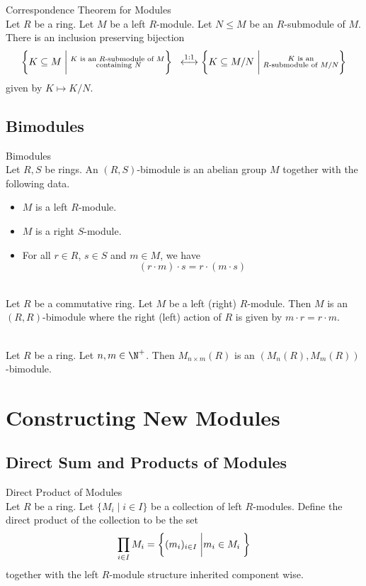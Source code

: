 \documentclass[a4paper]{article}
\begin{document}
\begin{thm}{Correspondence Theorem for Modules}{}\\
Let $R$ be a ring. Let $M$ be a left $R$-module. Let $N\leq M$ be an $R$-submodule of $M$. There is an inclusion preserving bijection $$\left\{K\subseteq M\;\bigg{|}\;\substack{K\text{ is an }R\text{-submodule of }M\\\text{ containing }N}\right\}\;\;\overset{1:1}{\longleftrightarrow}\left\{K\subseteq M/N\;\bigg{|}\;\substack{K\text{ is an}\\R\text{-submodule of }M/N}\right\}$$ given by $K\mapsto K/N$. 
\end{thm}

\subsection{Bimodules}
\begin{defn}{Bimodules}{}\\
Let $R,S$ be rings. An $(R,S)$-bimodule is an abelian group $M$ together with the following data. 
\begin{itemize}
\item $M$ is a left $R$-module. 
\item $M$ is a right $S$-module. 
\item For all $r\in R$, $s\in S$ and $m\in M$, we have $$(r\cdot m)\cdot s=r\cdot(m\cdot s)$$
\end{itemize}
\end{defn}

\begin{eg}{}{}\\
Let $R$ be a commutative ring. Let $M$ be a left (right) $R$-module. Then $M$ is an $(R,R)$-bimodule where the right (left) action of $R$ is given by $m\cdot r=r\cdot m$. 
\end{eg}

\begin{eg}{}{}\\
Let $R$ be a ring. Let $n,m\in\N^+$. Then $M_{n\times m}(R)$ is an $(M_n(R),M_m(R))$-bimodule. 
\end{eg}

\pagebreak
\section{Constructing New Modules}
\subsection{Direct Sum and Products of Modules}
\begin{defn}{Direct Product of Modules}{}\\
Let $R$ be a ring. Let $\{M_i\;|\;i\in I\}$ be a collection of left $R$-modules. Define the direct product of the collection to be the set $$\prod_{i\in I}M_i=\left\{(m_i)_{i\in I}\;\bigg{|}m_i\in M_i\;\right\}$$ together with the left $R$-module structure inherited component wise. 
\end{defn}
\end{document}

